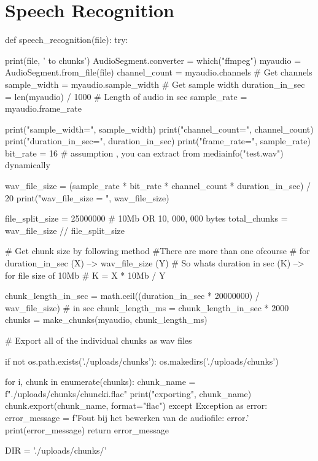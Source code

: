 \section{Speech Recognition}
\begin{python}
def speech_recognition(file):
    try:

        print(file, ' to chunks')
        AudioSegment.converter = which("ffmpeg")
        myaudio = AudioSegment.from_file(file)
        channel_count = myaudio.channels  # Get channels
        sample_width = myaudio.sample_width  # Get sample width
        duration_in_sec = len(myaudio) / 1000  # Length of audio in sec
        sample_rate = myaudio.frame_rate

        print("sample_width=", sample_width)
        print("channel_count=", channel_count)
        print("duration_in_sec=", duration_in_sec)
        print("frame_rate=", sample_rate)
        bit_rate = 16  # assumption , you can extract from mediainfo("test.wav") dynamically

        wav_file_size = (sample_rate * bit_rate * channel_count * duration_in_sec) / 20
        print("wav_file_size = ", wav_file_size)

        file_split_size = 25000000  # 10Mb OR 10, 000, 000 bytes
        total_chunks = wav_file_size // file_split_size

        # Get chunk size by following method #There are more than one ofcourse
        # for  duration_in_sec (X) -->  wav_file_size (Y)
        # So   whats duration in sec  (K) --> for file size of 10Mb
        #  K = X * 10Mb / Y

        chunk_length_in_sec = math.ceil((duration_in_sec * 20000000) / wav_file_size)  # in sec
        chunk_length_ms = chunk_length_in_sec * 2000
        chunks = make_chunks(myaudio, chunk_length_ms)

        # Export all of the individual chunks as wav files

        if not os.path.exists('./uploads/chunks'):
            os.makedirs('./uploads/chunks')

        for i, chunk in enumerate(chunks):
            chunk_name = f"./uploads/chunks/chunck{i}.flac"
            print("exporting", chunk_name)
            chunk.export(chunk_name, format="flac")
    except Exception as error:
        error_message = f'Fout bij het bewerken van de audiofile: {error}.'
        print(error_message)
        return error_message

    DIR = './uploads/chunks/'


\end{python}
